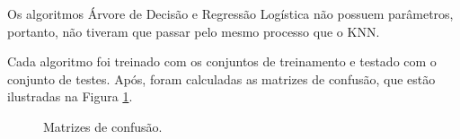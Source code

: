 Os algoritmos Árvore de Decisão e Regressão Logística não possuem parâmetros,
portanto, não tiveram que passar pelo mesmo processo que o KNN.

Cada algoritmo foi treinado com os conjuntos de treinamento e testado com o
conjunto de testes. Após, foram calculadas as matrizes de confusão, que estão
ilustradas na Figura \ref{confusionMatrixResult}.

\begin{figure}[!htb]
  \centering
  \caption{\label{confusionMatrixResult} Matrizes de confusão.}
  \qquad
  \qquad

\end{figure}
